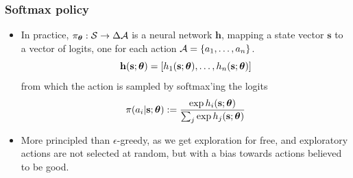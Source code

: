 \begin{frame}
    \frametitle{Softmax policy}
    
    \begin{itemize}
    \item In practice, $\pi_{\boldsymbol{\theta}} : \mathcal{S} \to \Delta \mathcal{A}$ is a neural network $\mathbf{h}$, mapping a state vector $\mathbf{s}$ to 
    a vector of logits, one for each action $\mathcal{A} = \{a_1, \ldots, a_n\}$.
    $$
    \mathbf{h}(\mathbf{s};{\boldsymbol{\theta}}) = [h_1(\mathbf{s};{\boldsymbol{\theta}}), \ldots, h_n(\mathbf{s};{\boldsymbol{\theta}})]
    $$
    from which the action is sampled by softmax'ing the logits
    $$
    \pi(a_i | \mathbf{s}; {\boldsymbol{\theta}}) := 
    \frac{\exp h_i(\mathbf{s};{\boldsymbol{\theta}})}{\sum_j \exp h_j(\mathbf{s};{\boldsymbol{\theta}})}
    $$
    \item More principled than $\epsilon$-greedy, as we get exploration for free,
    and exploratory actions are not selected at random, but with a bias towards
    actions believed to be good.
\end{itemize}
\end{frame}
%
%
%      
